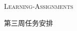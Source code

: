 \documentclass[landscape,a4paper]{article}
\begin{document}
\pagestyle{empty} %

\noindent


\begin{CJK}{UTF8}{gkai}
\begin{center}
\textsc{\LARGE Learning-Assignment\large s}\\ %
\begin{spacing}{1.5}
\end{spacing}
\textsc{\large 第三周任务安排} %
\end{center}
\end{CJK}
\end{document}
